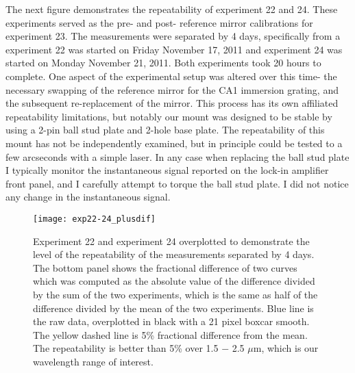 The next figure demonstrates the repeatability of experiment 22 and 24.  These experiments served as the pre- and post- reference mirror calibrations for experiment 23.  The measurements were separated by 4 days, specifically from a experiment 22 was started on Friday November 17, 2011 and experiment 24 was started on Monday November 21, 2011.  Both experiments took 20 hours to complete.  One aspect of the experimental setup was altered over this time- the necessary swapping of the reference mirror for the CA1 immersion grating, and the subsequent re-replacement of the mirror.  This process has its own affiliated repeatability limitations, but notably our mount was designed to be stable by using a 2-pin ball stud plate and 2-hole base plate.  The repeatability of this mount has not be independently examined, but in principle could be tested to a few arcseconds with a simple laser.  In any case when replacing the ball stud plate I typically monitor the instantaneous signal reported on the lock-in amplifier front panel, and I carefully attempt to torque the ball stud plate.  I did not notice any change in the instantaneous signal.


\begin{figure}
\begin{center}
    \texttt{[image: exp22-24\_plusdif]}
  \end{center}
  \caption[Repeatability experiment]{Experiment 22 and experiment 24 overplotted to demonstrate the level of the repeatability of the measurements separated by 4 days.  The bottom panel shows the fractional difference of two curves which was computed as the absolute value of the difference divided by the sum of the two experiments, which is the same as half of the difference divided by the mean of the two experiments.  Blue line is the raw data, overplotted in black with a 21 pixel boxcar smooth.  The yellow dashed line is 5\% fractional difference from the mean.  The repeatability is better than 5\% over 1.5 $-$ 2.5 $\mu$m, which is our wavelength range of interest.}
\end{figure}


